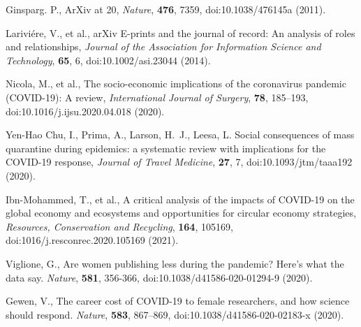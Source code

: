 \documentclass[]{rsos}%
\newcommand{\add}[1]{\textcolor{blue}{#1}}
\begin{document}



\pagebreak


\begin{thebibliography}{10}

{Ginsparg}. P., {ArXiv at 20}, \emph{Nature}, \textbf{476}, 7359, doi:10.1038/476145a \newblock (2011).

{Larivi{\'e}re, V., et al.,} {arXiv E-prints and the journal of record: An analysis of roles and relationships}, \emph{Journal of the Association for Information Science and Technology}, \textbf{65}, 6, doi:10.1002/asi.23044 \newblock (2014).


{Nicola, M., et al.,} {The socio-economic implications of the coronavirus pandemic ({COVID}-19): A review}, \emph{International Journal of Surgery}, \textbf{78}, 185--193, doi:10.1016/j.ijsu.2020.04.018 \newblock (2020).

{Yen-Hao Chu, I., Prima, A., Larson, H.~J., Leesa, L.}
{Social consequences of mass quarantine during epidemics: a systematic review with implications for the {COVID}-19 response}, \emph{Journal of Travel Medicine}, \textbf{27}, 7, doi:10.1093/jtm/taaa192 \newblock (2020).

{Ibn-Mohammed, T., et al.,} {A critical analysis of the impacts of {COVID}-19 on the global economy and ecosystems and opportunities for circular economy strategies}, \emph{Resources, Conservation and Recycling}, \textbf{164}, 105169, doi:1016/j.resconrec.2020.105169 \newblock (2021).


{Viglione, G.}, {Are women publishing less during the pandemic? Here\add{'}s what the data say}. \emph{Nature}, \textbf{581}, 356-366, doi:10.1038/d41586-020-01294-9 \newblock (2020).


{Gewen, V.}, {The career cost of COVID-19 to female researchers, and how science should respond}. \emph{Nature}, \textbf{583}, 867--869, doi:10.1038/d41586-020-02183-x \newblock (2020).




\end{thebibliography}
\end{document}
